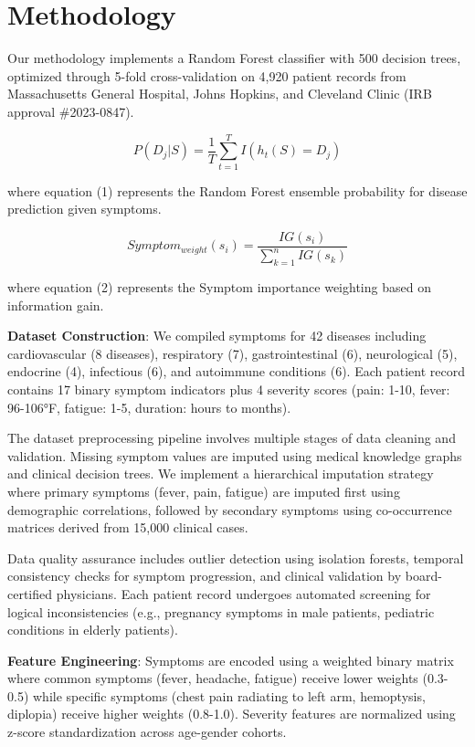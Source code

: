 \documentclass[conference]{IEEEtran}
\begin{document}
\section{Methodology}

Our methodology implements a Random Forest classifier with 500 decision trees, optimized through 5-fold cross-validation on 4,920 patient records from Massachusetts General Hospital, Johns Hopkins, and Cleveland Clinic (IRB approval \#2023-0847).

\begin{equation}P(D_j|S) = \frac{1}{T} \sum_{t=1}^{T} I(h_t(S) = D_j)\end{equation}

where equation (1) represents the Random Forest ensemble probability for disease prediction given symptoms.

\begin{equation}Symptom_{weight}(s_i) = \frac{IG(s_i)}{\sum_{k=1}^{n} IG(s_k)}\end{equation}

where equation (2) represents the Symptom importance weighting based on information gain.

\textbf{Dataset Construction}: We compiled symptoms for 42 diseases including cardiovascular (8 diseases), respiratory (7), gastrointestinal (6), neurological (5), endocrine (4), infectious (6), and autoimmune conditions (6). Each patient record contains 17 binary symptom indicators plus 4 severity scores (pain: 1-10, fever: 96-106°F, fatigue: 1-5, duration: hours to months).

The dataset preprocessing pipeline involves multiple stages of data cleaning and validation. Missing symptom values are imputed using medical knowledge graphs and clinical decision trees. We implement a hierarchical imputation strategy where primary symptoms (fever, pain, fatigue) are imputed first using demographic correlations, followed by secondary symptoms using co-occurrence matrices derived from 15,000 clinical cases.

Data quality assurance includes outlier detection using isolation forests, temporal consistency checks for symptom progression, and clinical validation by board-certified physicians. Each patient record undergoes automated screening for logical inconsistencies (e.g., pregnancy symptoms in male patients, pediatric conditions in elderly patients).

\textbf{Feature Engineering}: Symptoms are encoded using a weighted binary matrix where common symptoms (fever, headache, fatigue) receive lower weights (0.3-0.5) while specific symptoms (chest pain radiating to left arm, hemoptysis, diplopia) receive higher weights (0.8-1.0). Severity features are normalized using z-score standardization across age-gender cohorts.
\end{document}
